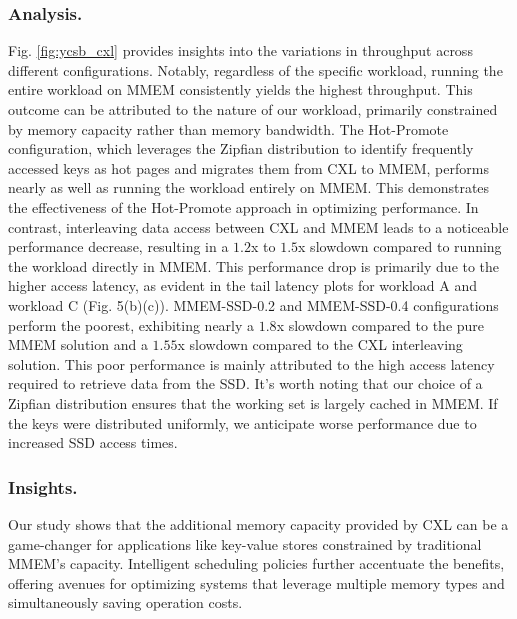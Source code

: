 \subsubsection{Analysis.} 
Fig. \ref{fig:ycsb_cxl} provides insights into the variations in throughput across different configurations. Notably, regardless of the specific workload, running the entire workload on MMEM consistently yields the highest throughput. This outcome can be attributed to the nature of our workload, primarily constrained by memory capacity rather than memory bandwidth. The Hot-Promote configuration, which leverages the Zipfian distribution to identify frequently accessed keys as hot pages and migrates them from CXL to MMEM, performs nearly as well as running the workload entirely on MMEM. This demonstrates the effectiveness of the Hot-Promote approach in optimizing performance. In contrast, interleaving data access between CXL and MMEM leads to a noticeable performance decrease, resulting in a $1.2$x to $1.5$x slowdown compared to running the workload directly in MMEM. This performance drop is primarily due to the higher access latency, as evident in the tail latency plots for workload A and workload C (Fig. 5(b)(c)). MMEM-SSD-0.2 and MMEM-SSD-0.4 configurations perform the poorest, exhibiting nearly a $1.8$x slowdown compared to the pure MMEM solution and a $1.55$x slowdown compared to the CXL interleaving solution. This poor performance is mainly attributed to the high access latency required to retrieve data from the SSD. 
It's worth noting that our choice of a Zipfian distribution ensures that the working set is largely cached in MMEM. If the keys were distributed uniformly, we anticipate worse performance due to increased SSD access times.



\subsubsection{Insights.}
Our study shows that the additional memory capacity provided by CXL can be a game-changer for applications like key-value stores constrained by traditional MMEM's capacity. Intelligent scheduling policies further accentuate the benefits, offering avenues for optimizing systems that leverage multiple memory types and simultaneously saving operation costs.


